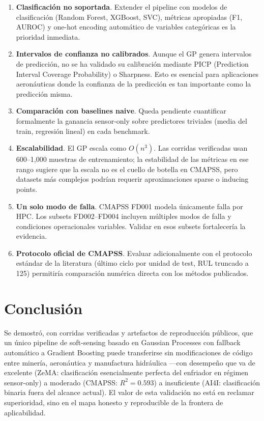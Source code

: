 \documentclass[10pt]{article}
\begin{document}
\begin{enumerate}
    \item \textbf{Clasificación no soportada}. Extender el pipeline con modelos de clasificación (Random Forest, XGBoost, SVC), métricas apropiadas (F1, AUROC) y one-hot encoding automático de variables categóricas es la prioridad inmediata.
    \item \textbf{Intervalos de confianza no calibrados}. Aunque el GP genera intervalos de predicción, no se ha validado su calibración mediante PICP (Prediction Interval Coverage Probability) o Sharpness. Esto es esencial para aplicaciones aeronáuticas donde la confianza de la predicción es tan importante como la predicción misma.
    \item \textbf{Comparación con baselines naive}. Queda pendiente cuantificar formalmente la ganancia sensor-only sobre predictores triviales (media del train, regresión lineal) en cada benchmark.
    \item \textbf{Escalabilidad}. El GP escala como $O(n^3)$. Las corridas verificadas usan 600--1,000 muestras de entrenamiento; la estabilidad de las métricas en ese rango sugiere que la escala no es el cuello de botella en CMAPSS, pero datasets más complejos podrían requerir aproximaciones sparse o inducing points.
    \item \textbf{Un solo modo de falla}. CMAPSS FD001 modela únicamente falla por HPC. Los subsets FD002--FD004 incluyen múltiples modos de falla y condiciones operacionales variables. Validar en esos subsets fortalecería la evidencia.
    \item \textbf{Protocolo oficial de CMAPSS}. Evaluar adicionalmente con el protocolo estándar de la literatura (último ciclo por unidad de test, RUL truncado a 125) permitiría comparación numérica directa con los métodos publicados.
\end{enumerate}

\section{Conclusión}

Se demostró, con corridas verificadas y artefactos de reproducción públicos, que un único pipeline de soft-sensing basado en Gaussian Processes con fallback automático a Gradient Boosting puede transferirse sin modificaciones de código entre minería, aeronáutica y manufactura hidráulica ---con desempeño que va de excelente (ZeMA: clasificación esencialmente perfecta del enfriador en régimen sensor-only) a moderado (CMAPSS: $R^2=0.593$) a insuficiente (AI4I: clasificación binaria fuera del alcance actual). El valor de esta validación no está en reclamar superioridad, sino en el mapa honesto y reproducible de la frontera de aplicabilidad.
\end{document}

